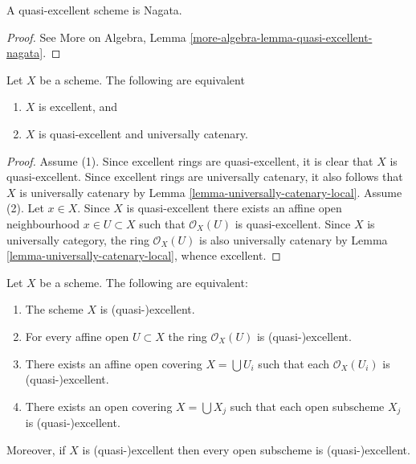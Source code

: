 \begin{lemma}
\label{lemma-quasi-excellent-nagata}
A quasi-excellent scheme is Nagata.
\end{lemma}

\begin{proof}
See More on Algebra, Lemma \ref{more-algebra-lemma-quasi-excellent-nagata}.
\end{proof}

\begin{lemma}
\label{lemma-characterize-excellent}
Let $X$ be a scheme. The following are equivalent
\begin{enumerate}
\item $X$ is excellent, and
\item $X$ is quasi-excellent and universally catenary.
\end{enumerate}
\end{lemma}

\begin{proof}
Assume (1). Since excellent rings are quasi-excellent, it is clear
that $X$ is quasi-excellent. Since excellent rings are universally
catenary, it also follows that $X$ is universally catenary by
Lemma \ref{lemma-universally-catenary-local}. Assume (2).
Let $x \in X$. Since $X$ is quasi-excellent there exists
an affine open neighbourhood $x \in U \subset X$
such that $\mathcal{O}_X(U)$ is quasi-excellent. Since
$X$ is universally category, the ring $\mathcal{O}_X(U)$ is also
universally catenary by Lemma \ref{lemma-universally-catenary-local},
whence excellent.
\end{proof}

\begin{lemma}
\label{lemma-locally-excellent}
Let $X$ be a scheme. The following are equivalent:
\begin{enumerate}
\item The scheme $X$ is (quasi-)excellent.
\item For every affine open $U \subset X$ the ring $\mathcal{O}_X(U)$
is (quasi-)excellent.
\item There exists an affine open covering $X = \bigcup U_i$ such that
each $\mathcal{O}_X(U_i)$ is (quasi-)excellent.
\item There exists an open covering $X = \bigcup X_j$
such that each open subscheme $X_j$ is (quasi-)excellent.
\end{enumerate}
Moreover, if $X$ is (quasi-)excellent then every open subscheme
is (quasi-)excellent.
\end{lemma}

